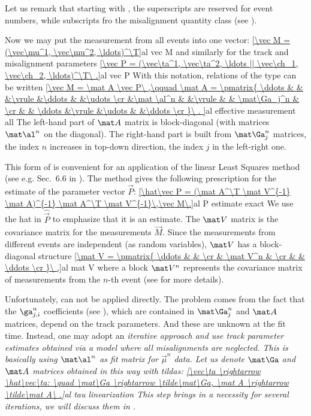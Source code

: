 Let us remark that starting with , the superscripts are reserved for event numbers, while subscripts fro the misalignment quantity class (see ).

Now we may put the measurement from all events into one vector:
\eqref{\vec M = (\vec\mu^1, \vec\mu^2, \ldots)^\T}{al vec M}
and similarly for the track and misalignment parameters
\eqref{\vec P = (\vec\ta^1, \vec\ta^2, \ldots || \vec\ch_1, \vec\ch_2, \ldots)^\T\ .}{al vec P}
With this notation, relations of the type  can be written
\eqref{\vec M = \mat A \vec P\ ,\qquad
	\mat A = \pmatrix{
	\ddots & 		&		&\vrule	&\ddots	&				&\udots	\cr
		&\mat \al^n	&		&\vrule	&		& \mat\Ga_j^n	&	\cr
		&		& \ddots	&\vrule	&\udots	&				&\ddots	\cr
	}\ .
}{al effective measurement all}
The left-hand part of $\mat A$ matrix is block-diagonal (with matrices $\mat\al^n$ on the diagonal). The right-hand part is built from $\mat\Ga_j^n$ matrices, the index $n$ increases in top-down direction, the index $j$ in the left-right one.

This form of  is convenient for an application of the linear Least Squares method (see e.g. Sec.~6.6 in ). The method gives the following prescription for the estimate of the parameter vector $\vec P$:
\eqref{\hat\vec P = (\mat A^\T \mat V^{-1} \mat A)^{-1} \mat A^\T \mat V^{-1}\,\vec M\.}{al P estimate exact}
We use the hat in $\hat\vec P$ to emphasize that it is an estimate. The $\mat V$ matrix is the covariance matrix for the measurements $\vec M$. Since the measurements from different events are independent (as random variables), $\mat V$ has a block-diagonal structure
\eqref{\mat V = \pmatrix{
\ddots	&			&			\cr
		& \mat V^n	&			\cr
		&			& \ddots	\cr
}\ ,}{al mat V}
where a block $\mat V^n$ represents the covariance matrix of measurements from the $n$-th event (see  for more details).

Unfortunately,  can not be applied directly. The problem comes from the fact that the $\ga^n_{j,i}$ coefficients (see ), which are contained in $\mat\Ga_j^n$ and $\mat A$ matrices, depend on the track parameters. And these are unknown at the fit time. Instead, one may adopt an \em{iterative} approach and use track parameter estimates obtained via a model where all misalignments are neglected. This is basically using $\mat \al^n$ as fit matrix for $\vec \mu^n$ data. Let us denote $\mat\Ga$ and $\mat A$ matrices obtained in this way with tildas:
\eqref{\vec\ta \rightarrow \hat\vec\ta: \quad \mat\Ga \rightarrow \tilde\mat\Ga, \mat A \rightarrow \tilde\mat A\ .}{al tau linearization}
This step brings in a necessity for several iterations, we will discuss them in .

